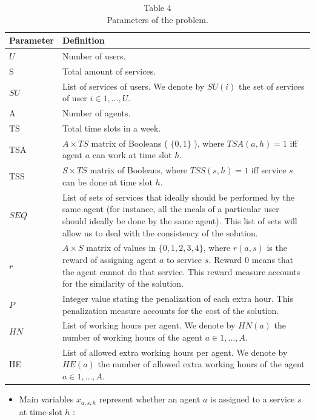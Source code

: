\documentclass[10pt]{article}
\begin{document}
\begin{table}[h]
\begin{center}
\captionsetup{labelformat=empty}
\caption{Table 4\\
Parameters of the problem.}
\begin{tabular}{|l|l|}
\hline
Parameter & Definition \\
\hline
$U$ & Number of users. \\
\hline
S & Total amount of services. \\
\hline
$S U$ & List of services of users. We denote by $S U(i)$ the set of services of user $i \in 1, \ldots, U$. \\
\hline
A & Number of agents. \\
\hline
TS & Total time slots in a week. \\
\hline
TSA & $A \times T S$ matrix of Booleans ( $\{0,1\}$ ), where $T S A(a, h)=1$ iff agent $a$ can work at time slot $h$. \\
\hline
TSS & $S \times T S$ matrix of Booleans, where $T S S(s, h)=1$ iff service $s$ can be done at time slot $h$. \\
\hline
$S E Q$ & List of sets of services that ideally should be performed by the same agent (for instance, all the meals of a particular user should ideally be done by the same agent). This list of sets will allow us to deal with the consistency of the solution. \\
\hline
$r$ & $A \times S$ matrix of values in $\{0,1,2,3,4\}$, where $r(a, s)$ is the reward of assigning agent $a$ to service $s$. Reward 0 means that the agent cannot do that service. This reward measure accounts for the similarity of the solution. \\
\hline
$P$ & Integer value stating the penalization of each extra hour. This penalization measure accounts for the cost of the solution. \\
\hline
$H N$ & List of working hours per agent. We denote by $H N(a)$ the number of working hours of the agent $a \in 1, \ldots, A$. \\
\hline
HE & List of allowed extra working hours per agent. We denote by $H E(a)$ the number of allowed extra working hours of the agent $a \in 1, \ldots, A$. \\
\hline
\end{tabular}
\end{center}
\end{table}

\begin{itemize}
  \item Main variables $x_{a, s, h}$ represent whether an agent $a$ is assigned to a service $s$ at time-slot $h$ :
\end{itemize}
\end{document}
